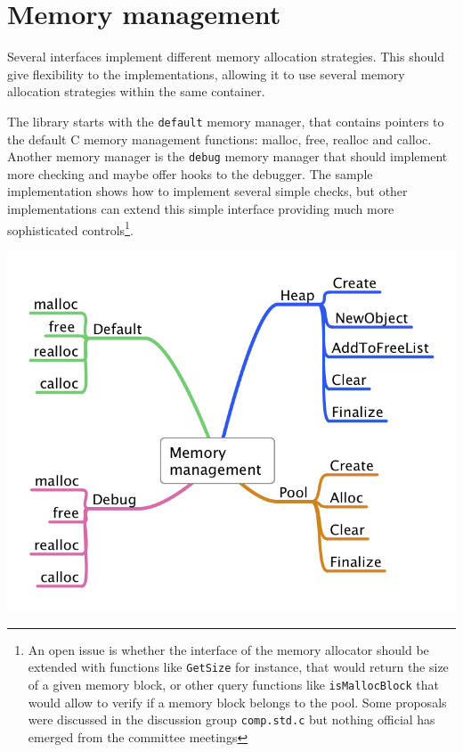 \documentclass[12pt,a4paper]{memoir} %
\begin{document}
\section{Memory management}
Several interfaces implement different memory allocation strategies. This should give flexibility to the implementations, allowing it to use several memory allocation strategies within the same container.\par
The library starts with the \texttt{default} memory manager, that contains pointers to the default C memory management functions: malloc, free, realloc and calloc. Another memory manager is the \texttt{debug} memory manager that should implement more checking and 
maybe offer hooks to the debugger. The sample
implementation shows how to implement several simple checks, but other implementations can extend this simple interface providing 
much more sophisticated controls\footnote{An open issue is whether the interface of the memory allocator should be extended with functions like
\texttt{GetSize} for instance, that would return the size of a given memory block, or other query functions like \texttt{isMallocBlock} that would
allow to verify if a memory block belongs to the pool. Some proposals were discussed in the discussion group \texttt{comp.std.c} but nothing official
has emerged from the committee meetings}.

\includegraphics[scale=0.45]{MemoryManagement.png}\par
\end{document}

